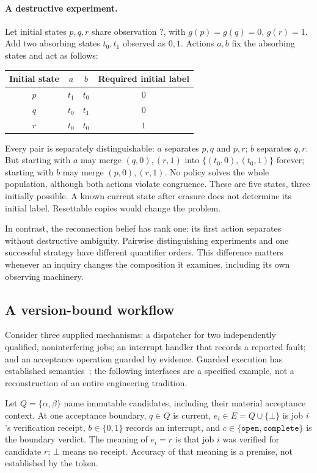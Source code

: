 \documentclass[11pt]{article}
\begin{document}
\paragraph{A destructive experiment.}\label{par:destructive}
Let initial states $p,q,r$ share observation $?$, with $g(p)=g(q)=0$, $g(r)=1$. Add two absorbing states $t_0,t_1$ observed as $0,1$. Actions $a,b$ fix the absorbing states and act as follows:
\begin{center}
\begin{tabular}{c@{\qquad}cc@{\qquad}c}
\toprule Initial state & $a$ & $b$ & Required initial label\\\midrule
$p$ & $t_1$ & $t_0$ & $0$\\
$q$ & $t_0$ & $t_1$ & $0$\\
$r$ & $t_0$ & $t_0$ & $1$\\\bottomrule
\end{tabular}
\end{center}
Every pair is separately distinguishable: $a$ separates $p,q$ and $p,r$; $b$ separates $q,r$. But starting with $a$ may merge $(q,0),(r,1)$ into $\{(t_0,0),(t_0,1)\}$ forever; starting with $b$ may merge $(p,0),(r,1)$. No policy solves the whole population, although both actions violate congruence. These are five states, three initially possible. A known current state after erasure does not determine its initial label. Resettable copies would change the problem.

In contrast, the reconnection belief has rank one: its first action separates without destructive ambiguity. Pairwise distinguishing experiments and one successful strategy have different quantifier orders. This difference matters whenever an inquiry changes the composition it examines, including its own observing machinery.

\subsection{A version-bound workflow}\label{sec:workflow}
Consider three supplied mechanisms: a dispatcher for two independently qualified, noninterfering jobs; an interrupt handler that records a reported fault; and an acceptance operation guarded by evidence. Guarded execution has established semantics~\cite{dijkstra}; the following interfaces are a specified example, not a reconstruction of an entire engineering tradition.

Let $Q=\{\alpha,\beta\}$ name immutable candidates, including their material acceptance context. At one acceptance boundary, $q\in Q$ is current, $e_i\in E=Q\cup\{\bot\}$ is job $i$'s verification receipt, $b\in\{0,1\}$ records an interrupt, and $c\in\{\mathtt{open},\mathtt{complete}\}$ is the boundary verdict. The meaning of $e_i=r$ is that job $i$ was verified for candidate $r$; $\bot$ means no receipt. Accuracy of that meaning is a premise, not established by the token.
\end{document}
